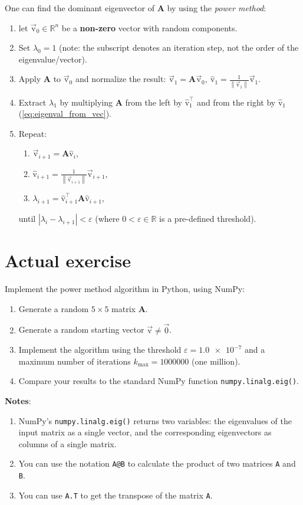 \documentclass[12pt]{scrartcl}
\newcommand{\mtrx}[1]{\mathbf{#1}}
\newcommand{\vvec}[1]{\vec{\mathrm{#1}}}
\newcommand{\uvec}[1]{\hat{\mathrm{#1}}}
\newcommand{\T}[1]{#1^{\intercal}}
\begin{document}
One can find the dominant eigenvector of $\mtrx{A}$ by using the \textit{power method}:
\begin{enumerate}
    \item let $\vvec{v}_{0}\in\mathbb{R}^{n}$ be a \textbf{non-zero} vector with random components.
    \item Set $\lambda_{0}=1$ (note: the subscript denotes an iteration step, not the order of the eigenvalue/vector).
    \item Apply $\mtrx{A}$ to $\vvec{v}_{0}$ and normalize the result: $\vvec{v}_{1}=\mtrx{A}\vvec{v}_{0},\ \uvec{v}_{1}=\frac{1}{\left\|\vvec{v}_{1}\right\|}\vvec{v}_{1}$.
    \item Extract $\lambda_{1}$ by multiplying $\mtrx{A}$ from the left by $\T{\uvec{v}_{1}}$ and from the right by $\uvec{v}_{1}$ (\autoref{eq:eigenval_from_vec}).
    \item Repeat:
        \begin{enumerate}
            \item $\vvec{v}_{i+1} = \mtrx{A}\uvec{v}_{i}$,
            \item $\uvec{v}_{i+1} = \frac{1}{\left\|\vvec{v}_{i+1}\right\|}\vvec{v}_{i+1}$,
            \item $\lambda_{i+1} = \T{\uvec{v}_{i+1}}\mtrx{A}\uvec{v}_{i+1}$,
        \end{enumerate}
        until $\left|\lambda_{i}-\lambda_{i+1}\right| < \varepsilon$ (where $0<\varepsilon\in\mathbb{R}$ is a pre-defined threshold).
\end{enumerate}

\section{Actual exercise}
Implement the power method algorithm in Python, using NumPy:
\begin{enumerate}
    \item Generate a random $5\times5$ matrix $\mtrx{A}$.
    \item Generate a random starting vector $\vvec{v}\neq\vvec{0}$.
    \item Implement the algorithm using the threshold $\varepsilon=\num{1.0e-7}$ and a maximum number of iterations $k_{\max}=\num{1000000}$ (one million).
    \item Compare your results to the standard NumPy function \texttt{numpy.linalg.eig()}.
\end{enumerate}

\textbf{Notes}:
\begin{enumerate}
    \item NumPy's \texttt{numpy.linalg.eig()} returns two variables: the eigenvalues of the input matrix as a single vector, and the corresponding eigenvectors as columns of a single matrix.
    \item You can use the notation \texttt{A@B} to calculate the product of two matrices \texttt{A} and \texttt{B}.
    \item You can use \texttt{A.T} to get the transpose of the matrix \texttt{A}.
\end{enumerate}
\end{document}
